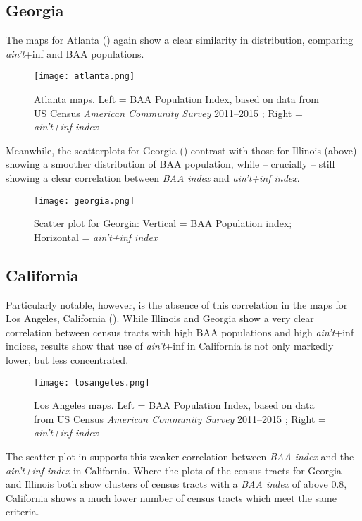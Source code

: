 \documentclass[output=paper,colorlinks,citecolor=brown,draftmode]{langscibook}
\begin{document}
\subsection{Georgia}
The maps for Atlanta () again show a clear similarity in distribution, comparing \textit{ain't}+inf and BAA populations.

\begin{figure}
    \texttt{[image: atlanta.png]}
    \caption{Atlanta maps. Left = BAA Population Index, based on data from US Census \textit{American Community Survey} 2011--2015 \citep{bureau2015}; Right = \textit{ain't+inf index}}
    \label{fig:atlanta}
\end{figure}

Meanwhile, the scatterplots for Georgia () contrast with those for Illinois (above) showing a smoother distribution of BAA population, while -- crucially -- still showing a clear correlation between \textit{BAA index} and \textit{ain't+inf index}.

\begin{figure}
    \texttt{[image: georgia.png]}
    \caption{Scatter plot for Georgia: Vertical = BAA Population index; Horizontal = \textit{ain't+inf index}}
    \label{fig:georgia}
\end{figure}

\subsection{California}
Particularly notable, however, is the absence of this correlation in the maps for Los Angeles, California (). While Illinois and Georgia show a very clear correlation between census tracts with high BAA populations and high \textit{ain't}+inf indices, results show that use of \textit{ain't}+inf in California is not only markedly lower, but less concentrated.

\begin{figure}
    \texttt{[image: losangeles.png]}
    \caption{Los Angeles maps. Left = BAA Population Index, based on data from US Census \textit{American Community Survey} 2011--2015 \citep{bureau2015}; Right = \textit{ain't+inf index}}
    \label{fig:losangeles}
\end{figure}

The scatter plot in  supports this weaker correlation between \textit{BAA index} and the \textit{ain't+inf index} in California. Where the plots of the census tracts for Georgia and Illinois both show clusters of census tracts with a \textit{BAA index} of above 0.8, California shows a much lower number of census tracts which meet the same criteria.  
\end{document}
